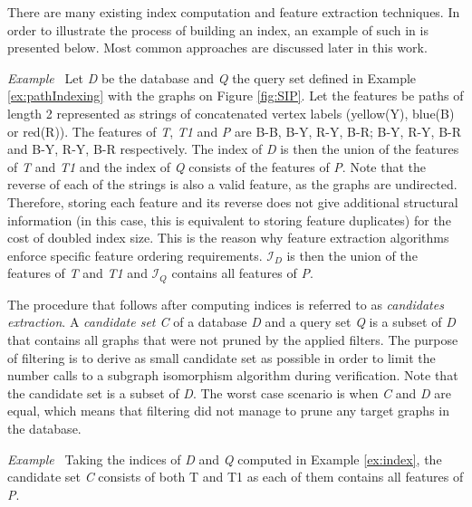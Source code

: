 \documentclass{l4proj}
\newcounter{example}[section]
\newenvironment{example}[1][]{\refstepcounter{example}\par\medskip
   \noindent \textit{Example~\theexample #1} \rmfamily}{\medskip}
\newcommand{\fancyI}{\mathcal{I}}
\begin{document}
There are many existing index computation and feature extraction techniques. In order to illustrate the process of building an index, an example of such in is presented below. Most common approaches are discussed later in this work.

\begin{example}
\label{ex:index}
Let \emph{D} be the database and \emph{Q} the query set defined in Example \ref{ex:pathIndexing} with the graphs on Figure \ref{fig:SIP}. Let the features be paths of length 2 represented as strings of concatenated vertex labels (yellow(Y), blue(B) or red(R)). The features of \emph{T}, \emph{T1} and \emph{P} are B-B, B-Y, R-Y, B-R; B-Y, R-Y, B-R and B-Y, R-Y, B-R respectively. The index of \emph{D} is then the union of the features of \emph{T} and \emph{T1} and the index of \emph{Q} consists of the features of \emph{P}. Note that the reverse of each of the strings is also a valid feature, as the graphs are undirected. Therefore, storing each feature and its reverse does not give additional structural information (in this case, this is equivalent to storing feature duplicates) for the cost of doubled index size. This is the reason why feature extraction algorithms enforce specific feature ordering requirements. $\fancyI_{D}$ is then the union of the features of \emph{T} and \emph{T1} and $\fancyI_{Q}$ contains all features of \emph{P}.
\end{example}

The procedure that follows after computing indices is referred to as \emph{candidates extraction}. A \emph{candidate set C} of a database \emph{D} and a query set \emph{Q} is a subset of \emph{D} that contains all graphs that were not pruned by the applied filters. 
The purpose of filtering is to derive as small candidate set as possible in order to limit the number calls to a subgraph isomorphism algorithm during verification. Note that the candidate set is a subset of \emph{D}. The worst case scenario is when \emph{C} and \emph{D} are equal, which means that filtering did not manage to prune any target graphs in the database.

\begin{example}
Taking the indices of \emph{D} and \emph{Q} computed in Example \ref{ex:index}, the candidate set \emph{C} consists of both T and T1 as each of them contains all features of \emph{P}.
\end{example}
\end{document}
